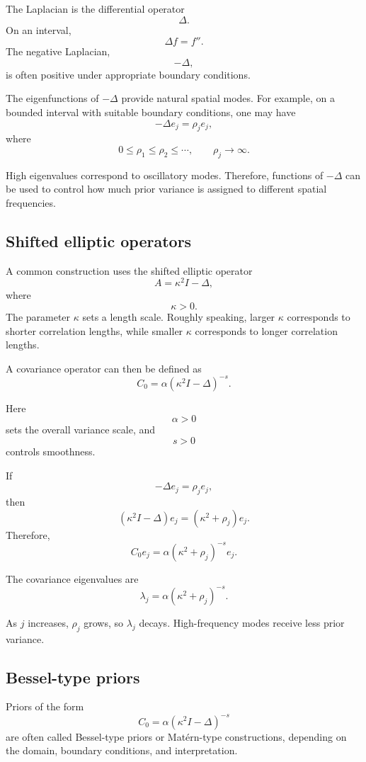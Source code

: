 \documentclass[11pt,a4paper]{book}
\begin{document}
The Laplacian is the differential operator
\[
    \Delta.
\]
On an interval,
\[
    \Delta f = f''.
\]
The negative Laplacian,
\[
    -\Delta,
\]
is often positive under appropriate boundary conditions.

The eigenfunctions of $-\Delta$ provide natural spatial modes. For example, on
a bounded interval with suitable boundary conditions, one may have
\[
    -\Delta e_j = \rho_j e_j,
\]
where
\[
    0\leq \rho_1\leq \rho_2\leq\cdots,
    \qquad
    \rho_j\to\infty.
\]

High eigenvalues correspond to oscillatory modes. Therefore, functions of
$-\Delta$ can be used to control how much prior variance is assigned to
different spatial frequencies.

\subsection{Shifted elliptic operators}

A common construction uses the shifted elliptic operator
\[
    A = \kappa^2 I - \Delta,
\]
where
\[
    \kappa>0.
\]
The parameter $\kappa$ sets a length scale. Roughly speaking, larger $\kappa$
corresponds to shorter correlation lengths, while smaller $\kappa$ corresponds
to longer correlation lengths.

A covariance operator can then be defined as
\[
    C_0
    =
    \alpha
    \left(
        \kappa^2 I - \Delta
    \right)^{-s}.
\]

Here
\[
    \alpha>0
\]
sets the overall variance scale, and
\[
    s>0
\]
controls smoothness.

If
\[
    -\Delta e_j=\rho_j e_j,
\]
then
\[
    (\kappa^2 I-\Delta)e_j
    =
    (\kappa^2+\rho_j)e_j.
\]
Therefore,
\[
    C_0 e_j
    =
    \alpha
    (\kappa^2+\rho_j)^{-s}e_j.
\]

The covariance eigenvalues are
\[
    \lambda_j
    =
    \alpha(\kappa^2+\rho_j)^{-s}.
\]

As $j$ increases, $\rho_j$ grows, so $\lambda_j$ decays. High-frequency modes
receive less prior variance.

\subsection{Bessel-type priors}

Priors of the form
\[
    C_0
    =
    \alpha
    \left(
        \kappa^2 I - \Delta
    \right)^{-s}
\]
are often called Bessel-type priors or Matérn-type constructions, depending on
the domain, boundary conditions, and interpretation.
\end{document}
